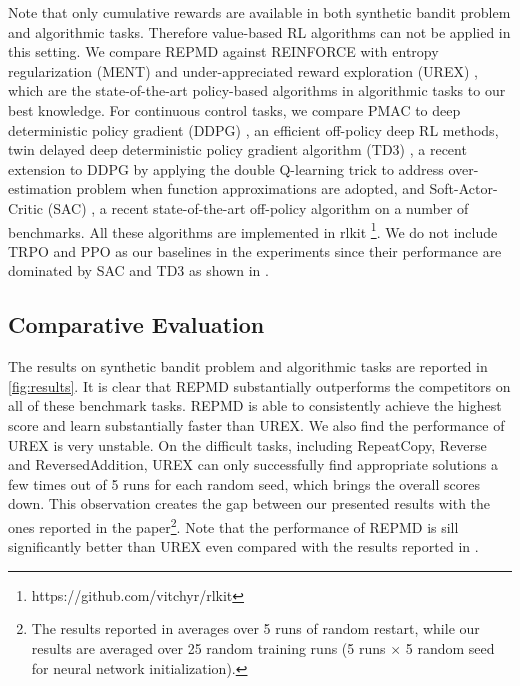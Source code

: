 Note that only cumulative rewards are available in both synthetic bandit problem and algorithmic tasks. Therefore value-based RL algorithms can not be applied in this setting. We compare REPMD against REINFORCE with entropy regularization (MENT) \citep{williams1992simple} and under-appreciated reward exploration (UREX) \citep{nachum2017improving}, which are the state-of-the-art policy-based algorithms in algorithmic tasks to our best knowledge. For continuous control tasks, we compare PMAC to deep deterministic policy gradient (DDPG) \citep{lillicrap2015continuous}, an efficient off-policy deep RL methods, twin delayed deep deterministic policy gradient algorithm (TD3) \citep{fujimoto2018addressing}, a recent extension to DDPG by applying the double Q-learning trick to address over-estimation problem when function approximations are adopted, and Soft-Actor-Critic (SAC) \citep{haarnoja2018soft}, a recent state-of-the-art off-policy algorithm on a number of benchmarks. All these algorithms are implemented in rlkit \footnote{https://github.com/vitchyr/rlkit}. We do not include TRPO and PPO as our baselines in the experiments since their performance are dominated by SAC and TD3 as shown in \citep{haarnoja2018soft,fujimoto2018addressing}. 


\subsection{Comparative Evaluation}

The results on synthetic bandit problem and algorithmic tasks are reported in \cref{fig:results}. It is clear that REPMD substantially outperforms the competitors on all of these benchmark tasks. REPMD is able to consistently achieve the highest score and learn substantially faster than UREX. We also find the performance of UREX is very unstable. On the difficult tasks, including RepeatCopy, Reverse and ReversedAddition, UREX can only successfully find appropriate solutions a few times out of 5 runs for each random seed, which brings the overall scores down. This observation creates the gap between our presented results with the ones reported in the paper\footnote{The results reported in \citet{nachum2017improving} averages over 5 runs of random restart, while our results are averaged over 25 random training runs (5 runs $\times$ 5 random seed for neural network initialization). }. Note that the performance of REPMD is sill significantly better than UREX even compared with the results reported in \citet{nachum2017improving}. 

